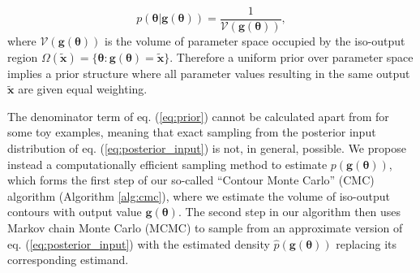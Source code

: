 \documentclass[10pt,letterpaper]{article}
\begin{document}
%
\begin{equation}\label{eq:contour_volume}
p(\boldsymbol{\theta}|\boldsymbol{g}(\boldsymbol{\theta})) = \frac{1}{\mathcal{V}(\boldsymbol{g}(\boldsymbol{\theta}))},
\end{equation}
%
where $\mathcal{V}(\boldsymbol{g}(\boldsymbol{\theta}))$ is the volume of parameter space occupied by the iso-output region $\Omega(\tilde{\boldsymbol{x}}) = \{\boldsymbol{\theta}: \boldsymbol{g}(\boldsymbol{\theta}) = \tilde{\boldsymbol{x}}\}$. Therefore a uniform prior over parameter space implies a prior structure where all  parameter values resulting in the same output $\tilde{\boldsymbol{x}}$ are given equal weighting.

The denominator term of eq. (\ref{eq:prior}) cannot be calculated apart from for some toy examples, meaning that exact sampling from the posterior input distribution of eq. (\ref{eq:posterior_input}) is not, in general, possible. We propose instead a computationally efficient sampling method to estimate $p(\boldsymbol{g}(\boldsymbol{\theta}))$, which forms the first step of our so-called ``Contour Monte Carlo'' (CMC) algorithm (Algorithm \ref{alg:cmc}), where we estimate the volume of iso-output contours with output value $\boldsymbol{g}(\boldsymbol{\theta})$. The second step in our algorithm then uses Markov chain Monte Carlo (MCMC) to sample from an approximate version of eq. (\ref{eq:posterior_input}) with the estimated density $\hat{p}(\boldsymbol{g}(\boldsymbol{\theta}))$ replacing its corresponding estimand.
\end{document}
